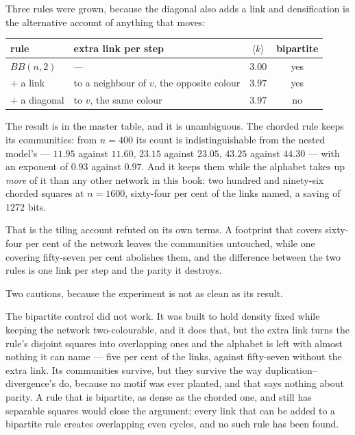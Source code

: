 Three rules were grown, because the diagonal also adds a link and densification is
the alternative account of anything that moves:

\begin{center}
\footnotesize
\begin{tabular}{llcc}
\hline
rule & extra link per step & $\langle k\rangle$ & bipartite\\
\hline
$BB(n,2)$              & ---                                        & $3.00$ & yes\\
$+$ a link             & to a neighbour of $v$, the opposite colour & $3.97$ & yes\\
$+$ a diagonal         & to $v$, the same colour                    & $3.97$ & no\\
\hline
\end{tabular}
\end{center}

\noindent The result is in the master table, and it is unambiguous. The chorded
rule keeps its communities: from $n=400$ its count is indistinguishable from the
nested model's --- $11.95$ against $11.60$, $23.15$ against $23.05$, $43.25$
against $44.30$ --- with an exponent of $0.93$ against $0.97$. And it keeps them
while the alphabet takes up \emph{more} of it than any other network in this
book: two hundred and ninety-six chorded squares at $n=1600$, sixty-four per cent
of the links named, a saving of $1272$ bits.

That is the tiling account refuted on its own terms. A footprint that covers
sixty-four per cent of the network leaves the communities untouched, while one
covering fifty-seven per cent abolishes them, and the difference between the two
rules is one link per step and the parity it destroys.

Two cautions, because the experiment is not as clean as its result.

The bipartite control did not work. It was built to hold density fixed while
keeping the network two-colourable, and it does that, but the extra link turns
the rule's disjoint squares into overlapping ones and the alphabet is left with
almost nothing it can name --- five per cent of the links, against fifty-seven
without the extra link. Its communities survive, but they survive the way
duplication--divergence's do, because no motif was ever planted, and that says
nothing about parity. A rule that is bipartite, as dense as the chorded one, and
still has separable squares would close the argument; every link that can be
added to a bipartite rule creates overlapping even cycles, and no such rule has
been found.

